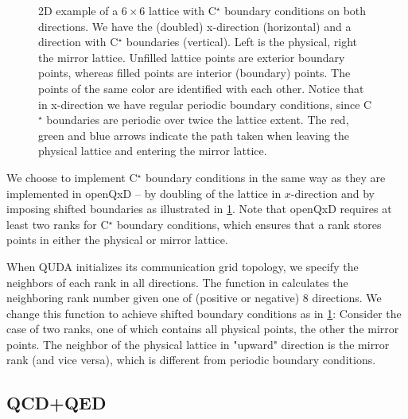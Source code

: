 \begin{figure}
  
  \caption{2D example of a $6 \times 6$ lattice with C$^\star$ boundary conditions on both directions. We have the (doubled) x-direction (horizontal) and a direction with C$^\star$ boundaries (vertical). Left is the physical, right the mirror lattice. Unfilled lattice points are exterior boundary points, whereas filled points are interior (boundary) points. The points of the same color are identified with each other. Notice that in x-direction we have regular periodic boundary conditions, since C$^\star$ boundaries are periodic over twice the lattice extent. The red, green and blue arrows indicate the path
  taken when leaving the physical lattice and entering the mirror lattice.}
  \label{fig:cstar}
\end{figure}

We choose to implement C$^\star$ boundary conditions in the same way as they are implemented in openQxD -- by doubling of the lattice in $x$-direction and by imposing shifted boundaries as illustrated in \cref{fig:cstar}. Note that openQxD requires at least two ranks for C$^\star$ boundary conditions,
which ensures that a rank stores points in either the physical or mirror lattice.

When QUDA initializes its communication grid topology, we specify the neighbors of each rank in all directions. The function  in  \cite{QUDApaper} calculates the neighboring rank number given one of (positive or negative) 8 directions. We change this function to achieve shifted boundary conditions as in \cref{fig:cstar}: Consider the case of two ranks, one of which contains all physical points, the other the mirror points. The neighbor of the physical lattice in "upward" direction is the mirror rank (and vice versa), which is different from periodic boundary conditions.

\subsection{QCD+QED}
\label{sec:qcd+qed}

